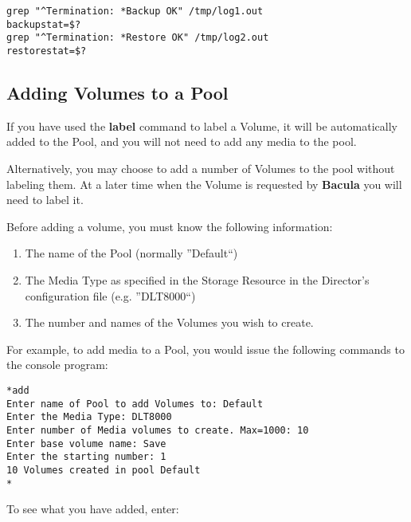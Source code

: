 \footnotesize
\begin{verbatim}
grep "^Termination: *Backup OK" /tmp/log1.out
backupstat=$?
grep "^Termination: *Restore OK" /tmp/log2.out
restorestat=$?
\end{verbatim}
\normalsize

\subsection*{Adding Volumes to a Pool}

If you have used the {\bf label} command to label a Volume, it will be
automatically added to the Pool, and you will not need to add any media to the
pool. 

Alternatively, you may choose to add a number of Volumes to the pool without
labeling them. At a later time when the Volume is requested by {\bf Bacula}
you will need to label it. 

Before adding a volume, you must know the following information: 

\begin{enumerate}
\item The name of the Pool (normally ''Default``)  
\item The Media Type as specified in the Storage Resource  in the Director's
   configuration file (e.g. ''DLT8000``)  
\item The number and names of the Volumes you wish to create. 
   \end{enumerate}

For example, to add media to a Pool, you would issue the following commands to
the console program: 

\footnotesize
\begin{verbatim}
*add
Enter name of Pool to add Volumes to: Default
Enter the Media Type: DLT8000
Enter number of Media volumes to create. Max=1000: 10
Enter base volume name: Save
Enter the starting number: 1
10 Volumes created in pool Default
*
\end{verbatim}
\normalsize

To see what you have added, enter: 

